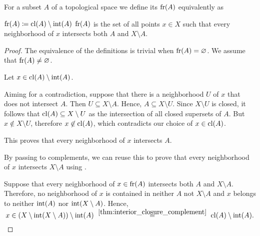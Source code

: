 \begin{definition}\label{def:topological_boundary}
  For a subset \( A \) of a topological space we define its  \( \operatorname{fr}(A) \) equivalently as
  \begin{thmenum}
     \( \operatorname{fr}(A) \coloneqq \operatorname{cl}(A) \setminus \operatorname{int}(A) \)
     \( \operatorname{fr}(A) \) is the set of all points \( x \in X \) such that every neighborhood of \( x \) intersects both \( A \) and \( X \setminus A \).
  \end{thmenum}
\end{definition}
\begin{proof}
  The equivalence of the definitions is trivial when \( \operatorname{fr}(A) = \varnothing \). We assume that \( \operatorname{fr}(A) \neq \varnothing \).

   Let \( x \in \operatorname{cl}(A) \setminus \operatorname{int}(A) \).

  Aiming for a contradiction, suppose that there is a neighborhood \( U \) of \( x \) that does not intersect \( A \). Then \( U \subseteq X \setminus A \). Hence, \( A \subseteq X \setminus U \). Since \( X \setminus U \) is closed, it follows that \( \operatorname{cl}(A) \subseteq X \setminus U \) as the intersection of all closed supersets of \( A \). But \( x \not\in X \setminus U \), therefore \( x \not\in \operatorname{cl}(A) \), which contradicts our choice of \( x \in \operatorname{cl}(A) \).

  This proves that every neighborhood of \( x \) intersects \( A \).

  By passing to complements, we can reuse this to prove that every neighborhood of \( x \) intersects \( X \setminus A \) using .

   Suppose that every neighborhood of \( x \in \operatorname{fr}(A) \) intersects both \( A \) and \( X \setminus A \). Therefore, no neighborhood of \( x \) is contained in neither \( A \) not \( X \setminus A \) and \( x \) belongs to neither \( \operatorname{int}(A) \) nor \( \operatorname{int}(X \setminus A) \). Hence,
  \begin{equation*}
    x \in (X \setminus \Int(X \setminus A)) \setminus \Int(A) \reloset {\ref{thm:interior_closure_complement}} = \cl(A) \setminus \Int(A).
  \end{equation*}
\end{proof}

